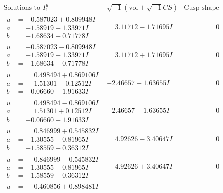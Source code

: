 \documentclass[1p]{elsarticle_modified}
\theoremstyle{definition}
\newcommand{\I}{\sqrt{-1}}
\begin{document}
$$\begin{array}{c|c|c}  
\text{Solutions to }I^u_{1}& \I (\text{vol} + \sqrt{-1}CS) & \text{Cusp shape}\\
 \hline 
\begin{aligned}
u &= -0.587023 + 0.809948 I \\
a &= -1.58919 - 1.33971 I \\
b &= -1.68634 - 0.71778 I\end{aligned}
 & \phantom{-}3.11712 - 1.71695 I & \phantom{-0.000000 } 0 \\ \hline\begin{aligned}
u &= -0.587023 - 0.809948 I \\
a &= -1.58919 + 1.33971 I \\
b &= -1.68634 + 0.71778 I\end{aligned}
 & \phantom{-}3.11712 + 1.71695 I & \phantom{-0.000000 } 0 \\ \hline\begin{aligned}
u &= \phantom{-}0.498494 + 0.869106 I \\
a &= \phantom{-}1.51301 - 0.12512 I \\
b &= -0.06660 + 1.91633 I\end{aligned}
 & -2.46657 - 1.63655 I & \phantom{-0.000000 } 0 \\ \hline\begin{aligned}
u &= \phantom{-}0.498494 - 0.869106 I \\
a &= \phantom{-}1.51301 + 0.12512 I \\
b &= -0.06660 - 1.91633 I\end{aligned}
 & -2.46657 + 1.63655 I & \phantom{-0.000000 } 0 \\ \hline\begin{aligned}
u &= \phantom{-}0.846999 + 0.545832 I \\
a &= -1.30555 + 0.81965 I \\
b &= -1.58559 + 0.36312 I\end{aligned}
 & \phantom{-}4.92626 - 3.40647 I & \phantom{-0.000000 } 0 \\ \hline\begin{aligned}
u &= \phantom{-}0.846999 - 0.545832 I \\
a &= -1.30555 - 0.81965 I \\
b &= -1.58559 - 0.36312 I\end{aligned}
 & \phantom{-}4.92626 + 3.40647 I & \phantom{-0.000000 } 0 \\ \hline\begin{aligned}
u &= \phantom{-}0.460856 + 0.898481 I \\

\end{aligned}
\end{array}$$
\end{document}
